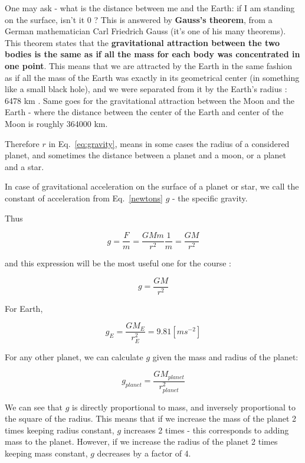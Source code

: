 \documentclass[paper=a4, fontsize=11pt]{scrartcl} %
\numberwithin{equation}{section} %
\begin{document}
One may ask - what is the distance between me and the Earth:  if I am standing on the surface, isn't it 0 ? 
This is answered by \textbf{Gauss's theorem}, from a German mathematician Carl Friedrich Gauss (it's one of his many theorems). This theorem states that the \textbf{gravitational attraction between the two bodies is the same as if all the mass for each body was concentrated in one point}. This means that we are attracted by the Earth in the same fashion as if all the mass of the Earth was exactly in its geometrical center (in something like a small black hole),  and we were separated from it by the Earth's radius : 6478 km . Same goes for the gravitational attraction between the Moon and the Earth - where the distance between the center of the Earth and center of the Moon is roughly 364000 km. 

Therefore $r$ in Eq.~\ref{eq:gravity}, means in some cases the radius of a considered planet, and sometimes the distance between a planet and a moon, or a planet and a star. 



In case of gravitational acceleration on the surface of a planet or star, we call the constant of acceleration from Eq.~\ref{newtons} $g$  - the specific gravity. 

Thus 

\begin{equation}
g = \frac{F}{m} = \frac{G M m}{r^{2}} \frac{1}{m} = \frac{GM}{r^{2}}
\end{equation}

and this expression will be the  most useful one for the course :

\begin{equation}
g = \frac{GM}{r^{2}}
\end{equation}


For Earth, 

\begin{equation}
g_{E} = \frac{GM_{E}}{r_{E}^{2}} = 9.81 [m s^{-2}]
\end{equation}

For any other planet, we can calculate $g$ given the mass and radius of the planet: 

\begin{equation}
g_{planet} = \frac{GM_{planet}}{r_{planet}^{2}}
\end{equation}




We can see that $g$ is directly proportional to mass, and inversely proportional to the square of the radius. This means that if we increase the mass of the planet 2 times keeping radius constant, $g$ increases 2 times - this corresponds to adding mass to the planet. However, if we increase the radius of the planet 2 times keeping mass constant,   $g$ decreases by a factor of 4. 
\end{document}
